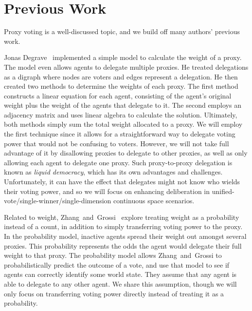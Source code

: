 \section{Previous Work}\label{sec:previous-work}
Proxy voting is a well-discussed topic, and we build off many authors' previous work.

Jonas Degrave~\cite{Degrave2014} implemented a simple model to calculate the
weight of a proxy.
The model even allows agents to delegate multiple proxies.
He treated delegations as a digraph where nodes are voters and edges represent
a delegation.
He then created two methods to determine the weights of each proxy.
The first method constructs a linear equation for each agent, consisting of the
agent's original weight plus the weight of the agents that delegate to it.
The second employs an adjacency matrix and uses linear algebra to calculate the
solution.
Ultimately, both methods simply sum the total weight allocated to a proxy.
We will employ the first technique since it allows for a straightforward way to
delegate voting power that would not be confusing to voters.
However, we will not take full advantage of it by disallowing proxies to delegate to
other proxies, as well as only allowing each agent to delegate one proxy.
Such proxy-to-proxy delegation is known as \textit{liquid democracy}, which has its own
advantages and challenges.
Unfortunately, it can have the effect that delegates might not know who wields their
voting power, and so we will focus on enhancing deliberation in
unified-vote/single-winner/single-dimension continuous space scenarios.

Related to weight, Zhang~and~Grossi~\cite{Zhang2022} explore treating weight as a
probability instead of a count, in addition to simply transferring voting power to
the proxy.
In the probability model, inactive agents spread their weight out amongst several
proxies.
This probability represents the odds the agent would delegate their full weight to that
proxy.
The probability model allows Zhang~and~Grossi to probabilistically predict the
outcome of a vote, and use that model to see if agents can correctly identify some
world state.
They assume that any agent is able to delegate to any other agent.
We share this assumption, though we will only focus on transferring voting power
directly instead of treating it as a probability.

